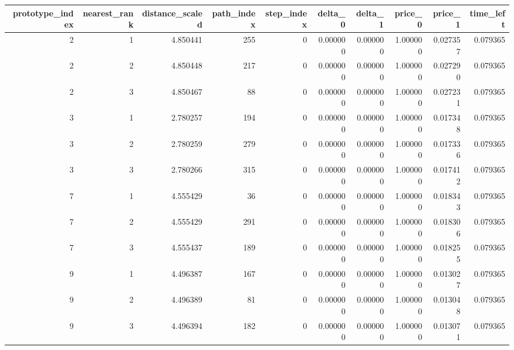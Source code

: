 \begin{tabular}{rrrrrrrrrr}
\toprule
prototype_index & nearest_rank & distance_scaled & path_index & step_index & delta_0 & delta_1 & price_0 & price_1 & time_left \\
\midrule
2 & 1 & 4.850441 & 255 & 0 & 0.000000 & 0.000000 & 1.000000 & 0.027357 & 0.079365 \\
2 & 2 & 4.850448 & 217 & 0 & 0.000000 & 0.000000 & 1.000000 & 0.027290 & 0.079365 \\
2 & 3 & 4.850467 & 88 & 0 & 0.000000 & 0.000000 & 1.000000 & 0.027231 & 0.079365 \\
3 & 1 & 2.780257 & 194 & 0 & 0.000000 & 0.000000 & 1.000000 & 0.017348 & 0.079365 \\
3 & 2 & 2.780259 & 279 & 0 & 0.000000 & 0.000000 & 1.000000 & 0.017336 & 0.079365 \\
3 & 3 & 2.780266 & 315 & 0 & 0.000000 & 0.000000 & 1.000000 & 0.017412 & 0.079365 \\
7 & 1 & 4.555429 & 36 & 0 & 0.000000 & 0.000000 & 1.000000 & 0.018343 & 0.079365 \\
7 & 2 & 4.555429 & 291 & 0 & 0.000000 & 0.000000 & 1.000000 & 0.018306 & 0.079365 \\
7 & 3 & 4.555437 & 189 & 0 & 0.000000 & 0.000000 & 1.000000 & 0.018255 & 0.079365 \\
9 & 1 & 4.496387 & 167 & 0 & 0.000000 & 0.000000 & 1.000000 & 0.013027 & 0.079365 \\
9 & 2 & 4.496389 & 81 & 0 & 0.000000 & 0.000000 & 1.000000 & 0.013048 & 0.079365 \\
9 & 3 & 4.496394 & 182 & 0 & 0.000000 & 0.000000 & 1.000000 & 0.013071 & 0.079365 \\
\bottomrule
\end{tabular}
